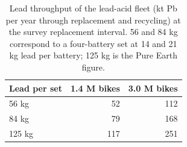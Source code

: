 \begin{table}[t]
\caption{Lead throughput of the lead-acid fleet (kt Pb per year through replacement and recycling) at the survey replacement interval. 56 and 84 kg correspond to a four-battery set at 14 and 21 kg lead per battery; 125 kg is the Pure Earth figure.}
\label{tab:lead}
\centering\footnotesize
\begin{tabular}{lrr}
\hline
Lead per set & 1.4 M bikes & 3.0 M bikes \\
\hline
56 kg & 52 & 112 \\
84 kg & 79 & 168 \\
125 kg & 117 & 251 \\
\hline
\end{tabular}
\end{table}
